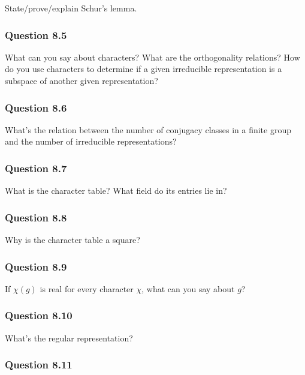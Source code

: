 State/prove/explain Schur's lemma.

\hypertarget{question-8.5}{%
\subsubsection{Question 8.5}\label{question-8.5}}

What can you say about characters? What are the orthogonality relations?
How do you use characters to determine if a given irreducible
representation is a subspace of another given representation?

\hypertarget{question-8.6}{%
\subsubsection{Question 8.6}\label{question-8.6}}

What's the relation between the number of conjugacy classes in a finite
group and the number of irreducible representations?

\hypertarget{question-8.7}{%
\subsubsection{Question 8.7}\label{question-8.7}}

What is the character table? What field do its entries lie in?

\hypertarget{question-8.8}{%
\subsubsection{Question 8.8}\label{question-8.8}}

Why is the character table a square?

\hypertarget{question-8.9}{%
\subsubsection{Question 8.9}\label{question-8.9}}

If \(\chi(g)\) is real for every character \(\chi\), what can you say
about \(g\)?

\hypertarget{question-8.10}{%
\subsubsection{Question 8.10}\label{question-8.10}}

What's the regular representation?

\hypertarget{question-8.11}{%
\subsubsection{Question 8.11}\label{question-8.11}}

